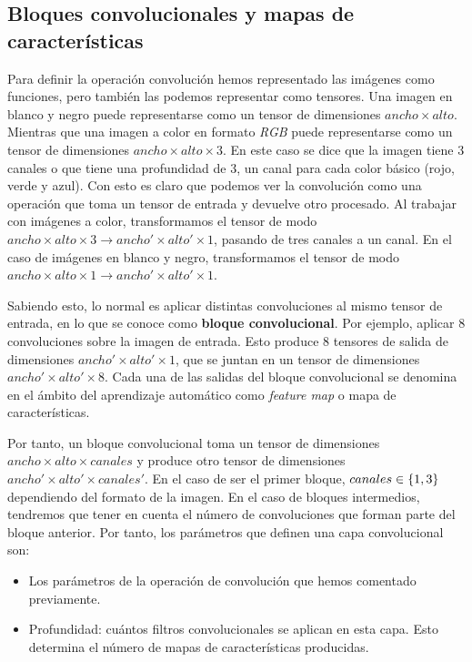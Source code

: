 \subsection{Bloques convolucionales y mapas de características}

Para definir la operación convolución hemos representado las imágenes como funciones, pero también las podemos representar como tensores. Una imagen en blanco y negro puede representarse como un tensor de dimensiones $ancho \times alto$. Mientras que una imagen a color en formato \textit{RGB} puede representarse como un tensor de dimensiones $ancho \times alto \times 3$. En este caso se dice que la imagen tiene 3 canales o que tiene una profundidad de 3, un canal para cada color básico (rojo, verde y azul). Con esto es claro que podemos ver la convolución como una operación que toma un tensor de entrada y devuelve otro procesado. Al trabajar con imágenes a color, transformamos el tensor de modo $ancho \times alto \times 3 \to ancho' \times alto' \times 1$, pasando de tres canales a un canal. En el caso de imágenes en blanco y negro, transformamos el tensor de modo $ancho \times alto \times 1 \to ancho' \times alto' \times 1$.

Sabiendo esto, lo normal es aplicar distintas convoluciones al mismo tensor de entrada, en lo que se conoce como \textbf{bloque convolucional}. Por ejemplo, aplicar 8 convoluciones sobre la imagen de entrada. Esto produce 8 tensores de salida de dimensiones $ancho' \times alto' \times 1$, que se juntan en un tensor de dimensiones $ancho' \times alto' \times 8$. Cada una de las salidas del bloque convolucional se denomina en el ámbito del aprendizaje automático como \textit{feature map} o mapa de características.

Por tanto, un bloque convolucional toma un tensor de dimensiones $ancho \times alto \times canales$ y produce otro tensor de dimensiones $ancho' \times alto' \times canales'$. En el caso de ser el primer bloque, $canales \in \{ 1, 3 \}$ dependiendo del formato de la imagen. En el caso de bloques intermedios, tendremos que tener en cuenta el número de convoluciones que forman parte del bloque anterior. Por tanto, los parámetros que definen una capa convolucional son:

\begin{itemize}
    \item Los parámetros de la operación de convolución que hemos comentado previamente.
    \item Profundidad: cuántos filtros convolucionales se aplican en esta capa. Esto determina el número de mapas de características producidas.
\end{itemize}

